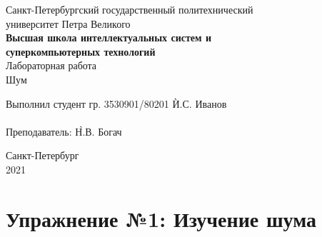 \documentclass[a4paper, 14pt]{extarticle}
\begin{document}
    \begin{center}
        \begin{center}
            \hfill \break
            \normalsize{Санкт-Петербургский государственный политехнический}\\
            \normalsize{университет Петра Великого}\\
            \hfill \break
            \normalsize{\textbf{Высшая школа интеллектуальных систем и}}\\
            \normalsize{\textbf{суперкомпьютерных технологий}}\\
            \hfill \break
            \hfill \break
            \hfill \break
            \normalsize{Лабораторная работа}\\
            \hfill \break
            \normalsize{\LARGE Шум}\\
        \end{center}
        \hfill \break
        \hfill \break
        \hfill \break
        \hfill \break
        \hfill \break
        \hfill \break
        \hfill \break
        \hfill \break
        \hfill \break
        \hfill \break
        \begin{tabbing}
            Выполнил студент гр. 3530901/80201 \`И.С. Иванов\\
            \\
            Преподаватель: \`Н.В. Богач\\
        \end{tabbing}
        \hfill \break
        \hfill \break
        \hfill \break
        \hfill \break
        \begin{center}
            Санкт-Петербург\\
            2021
        \end{center}
        \thispagestyle{empty}
    \end{center}

    \newpage
    \tableofcontents

    \newpage
    \listoffigures

    \newpage
    \lstlistoflistings

    \newpage


    \section{Упражнение №1: Изучение шума}
    \label{sec:1}
\end{document}
